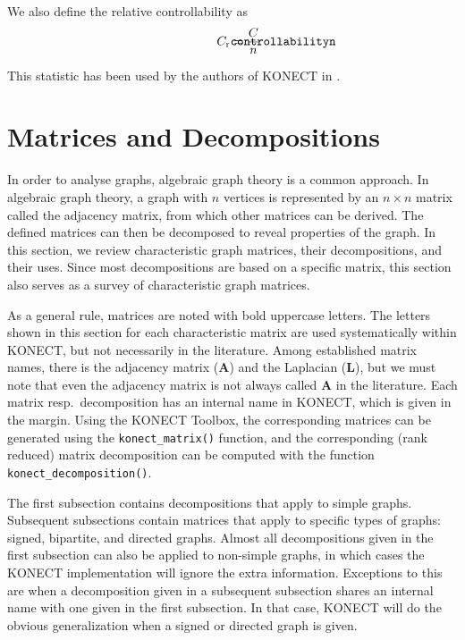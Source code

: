 \documentclass{article}
\def\mathnote#1{%
  \tag*{\rlap{\hspace\marginparsep\smash{\parbox[t]{\marginparwidth}{#1}}}}
}
\begin{document}
We also define the relative controllability as
\begin{align*}
  \mathnote{\texttt{controllabilityn}}
  C_{\mathrm r} &= \frac C n 
\end{align*}

This statistic has been used by the authors of KONECT in
\citep{kunegis:network-rank}. 

\section{Matrices and Decompositions}
\label{sec:matrix}
In order to analyse graphs, algebraic graph theory is a common
approach.  In algebraic graph theory, a graph with $n$ vertices is
represented by an $n\times n$ matrix called the adjacency matrix, from
which other matrices can be derived.  The defined matrices can then be
decomposed to reveal properties of the graph. 
In this section, we review characteristic graph matrices, their
decompositions, and their uses.  Since most decompositions are based on
a specific matrix, this section also serves as a survey of
characteristic graph matrices.  

As a general rule, matrices are noted with bold uppercase letters.  The
letters shown in this section for each characteristic matrix are used
systematically within KONECT, but not necessarily in the literature.
Among established matrix names, there is the adjacency matrix ($\mathbf
A$) and the Laplacian ($\mathbf L$), but we must note that even the
adjacency matrix is not always called $\mathbf A$ in the literature.
Each matrix resp.\ decomposition has an internal name in KONECT, which
is given in the margin.  Using the KONECT Toolbox, the corresponding
matrices can be generated using the \texttt{konect\_matrix()} function,
and the corresponding (rank reduced) matrix decomposition can be
computed with the function \texttt{konect\_decomposition()}. 

The first subsection contains decompositions that apply to simple
graphs.  Subsequent subsections contain matrices that apply to specific
types of graphs: signed, bipartite, and directed graphs.  Almost all
decompositions given in the first subsection can also be applied to
non-simple graphs, in which cases the KONECT implementation will ignore
the extra information.  Exceptions to this are when a decomposition
given in a subsequent subsection shares an internal name with one given
in the first subsection.  In that case, KONECT will do the obvious
generalization when a signed or directed graph is given. 
\end{document}

